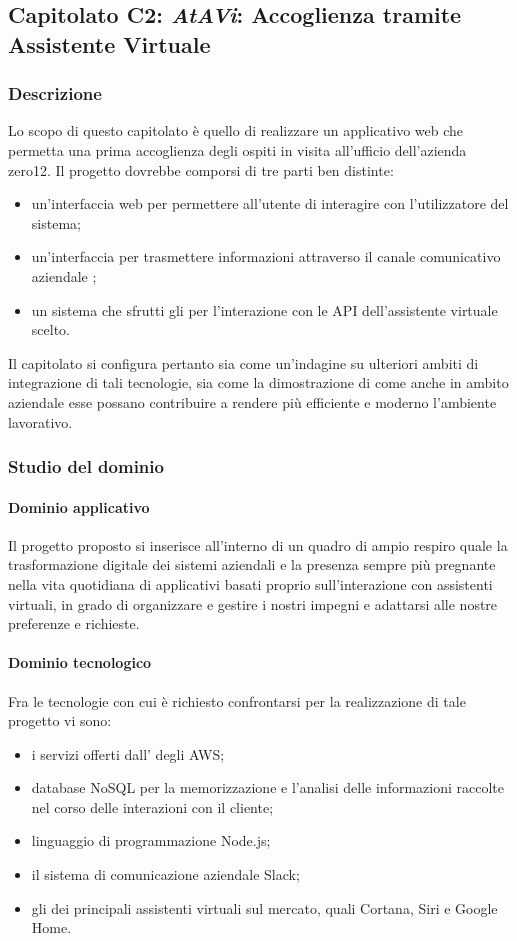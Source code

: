 	\subsection{Capitolato C2: \emph{AtAVi}: Accoglienza tramite Assistente Virtuale}
		\subsubsection{Descrizione}
		Lo scopo di questo capitolato è quello di realizzare un applicativo web che permetta una prima accoglienza degli ospiti in visita all'ufficio dell'azienda zero12. Il progetto dovrebbe comporsi di tre parti ben distinte: 
		\begin{itemize}
			\item un'interfaccia web per permettere all'utente di interagire con l'utilizzatore del sistema;
			\item un'interfaccia per trasmettere informazioni attraverso il canale comunicativo aziendale ;
			\item un sistema che sfrutti gli  per l'interazione con le API dell'assistente virtuale scelto.
		\end{itemize}
		Il capitolato si configura pertanto sia come un'indagine su ulteriori ambiti di integrazione di tali tecnologie, sia come la dimostrazione di come anche in ambito aziendale esse possano contribuire a rendere più efficiente e moderno l'ambiente lavorativo.
		\subsubsection{Studio del dominio}
			\paragraph{Dominio applicativo}
			Il progetto proposto si inserisce all'interno di un quadro di ampio respiro quale la trasformazione digitale dei sistemi aziendali e la presenza sempre più pregnante nella vita quotidiana di applicativi basati proprio sull'interazione con assistenti virtuali, in grado di organizzare e gestire i nostri impegni e adattarsi alle nostre preferenze e richieste.
			
			\paragraph{Dominio tecnologico}
			Fra le tecnologie con cui è richiesto confrontarsi per la realizzazione di tale progetto vi sono:
			\begin{itemize}
				\item i servizi offerti dall' degli AWS;
				\item database NoSQL per la memorizzazione e l'analisi delle informazioni raccolte nel corso delle interazioni con il cliente;
				\item linguaggio di programmazione Node.js;
				\item il sistema di comunicazione aziendale Slack;
				\item gli  dei principali assistenti virtuali sul mercato, quali Cortana, Siri e Google Home.
			\end{itemize}
